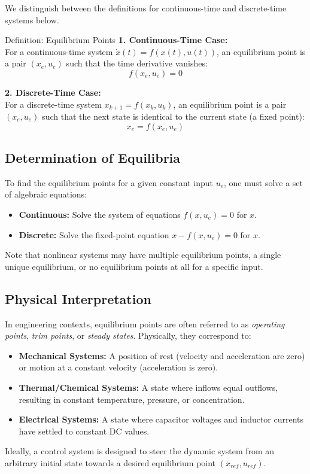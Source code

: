 We distinguish between the definitions for continuous-time and discrete-time systems below.

\begin{defnbox}{Definition: Equilibrium Points}
	\textbf{1. Continuous-Time Case:} \\
	For a continuous-time system $\dot{x}(t) = f(x(t), u(t))$, an equilibrium point is a pair $(x_e, u_e)$ such that the time derivative vanishes:
	\begin{equation}
		f(x_e, u_e) = 0
	\end{equation}
	
	\textbf{2. Discrete-Time Case:} \\
	For a discrete-time system $x_{k+1} = f(x_k, u_k)$, an equilibrium point is a pair $(x_e, u_e)$ such that the next state is identical to the current state (a fixed point):
	\begin{equation}
		x_e = f(x_e, u_e)
	\end{equation}
\end{defnbox}

\subsection*{Determination of Equilibria}
To find the equilibrium points for a given constant input $u_e$, one must solve a set of algebraic equations:
\begin{itemize}
	\item \textbf{Continuous:} Solve the system of equations $f(x, u_e) = 0$ for $x$.
	\item \textbf{Discrete:} Solve the fixed-point equation $x - f(x, u_e) = 0$ for $x$.
\end{itemize}
Note that nonlinear systems may have multiple equilibrium points, a single unique equilibrium, or no equilibrium points at all for a specific input.

\subsection*{Physical Interpretation}
In engineering contexts, equilibrium points are often referred to as \textit{operating points}, \textit{trim points}, or \textit{steady states}. Physically, they correspond to:
\begin{itemize}
	\item \textbf{Mechanical Systems:} A position of rest (velocity and acceleration are zero) or motion at a constant velocity (acceleration is zero).
	\item \textbf{Thermal/Chemical Systems:} A state where inflows equal outflows, resulting in constant temperature, pressure, or concentration.
	\item \textbf{Electrical Systems:} A state where capacitor voltages and inductor currents have settled to constant DC values.
\end{itemize}
Ideally, a control system is designed to steer the dynamic system from an arbitrary initial state towards a desired equilibrium point $(x_{ref}, u_{ref})$.


